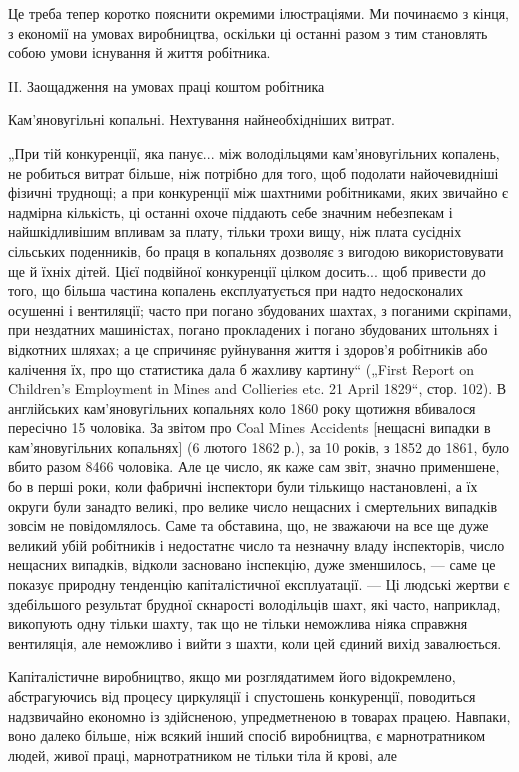 Це треба тепер коротко пояснити окремими ілюстраціями.
Ми починаємо з кінця, з економії на умовах виробництва,
оскільки ці останні разом з тим становлять собою умови існування й життя робітника.

II. Заощадження на умовах праці коштом робітника

Кам’яновугільні копальні. Нехтування найнеобхідніших витрат.

„При тій конкуренції, яка панує... між володільцями кам’яновугільних копалень, не робиться витрат
більше, ніж потрібно
для того, щоб подолати найочевидніші фізичні труднощі; а при
конкуренції між шахтними робітниками, яких звичайно є надмірна кількість, ці останні охоче піддають
себе значним небезпекам і найшкідливішим впливам за плату, тільки трохи вищу,
ніж плата сусідніх сільських поденників, бо праця в копальнях
дозволяє з вигодою використовувати ще й їхніх дітей. Цієї подвійної конкуренції цілком досить... щоб
привести до того, що
більша частина копалень експлуатується при надто недосконалих осушенні і вентиляції; часто при
погано збудованих шахтах,
з поганими скріпами, при нездатних машиністах, погано прокладених і погано збудованих штольнях і
відкотних шляхах; а це спричиняє руйнування життя і здоров’я робітників або калічення їх,
про що статистика дала б жахливу картину“ („First Report
on Children’s Employment in Mines and Collieries etc. 21 April
1829“, стор. 102). В англійських кам’яновугільних копальнях коло
1860 року щотижня вбивалося пересічно 15 чоловіка. За звітом
про Coal Mines Accidents [нещасні випадки в кам’яновугільних
копальнях] (6 лютого 1862 р.), за 10 років, з 1852 до 1861,
було вбито разом 8466 чоловіка. Але це число, як каже сам
звіт, значно применшене, бо в перші роки, коли фабричні інспектори були тількищо настановлені, а їх
округи були занадто
великі, про велике число нещасних і смертельних випадків зовсім не повідомлялось. Саме та обставина,
що, не зважаючи на
все ще дуже великий убій робітників і недостатнє число та
незначну владу інспекторів, число нещасних випадків, відколи
засновано інспекцію, дуже зменшилось, — саме це показує природну тенденцію капіталістичної
експлуатації. — Ці людські
жертви є здебільшого результат брудної скнарості володільців
шахт, які часто, наприклад, викопують одну тільки шахту, так
що не тільки неможлива ніяка справжня вентиляція, але неможливо і вийти з шахти, коли цей єдиний
вихід завалюється.

Капіталістичне виробництво, якщо ми розглядатимем його
відокремлено, абстрагуючись від процесу циркуляції і спустошень конкуренції, поводиться надзвичайно
економно із здійсненою, упредметненою в товарах працею. Навпаки, воно далеко
більше, ніж всякий інший спосіб виробництва, є марнотратником
людей, живої праці, марнотратником не тільки тіла й крові, але
